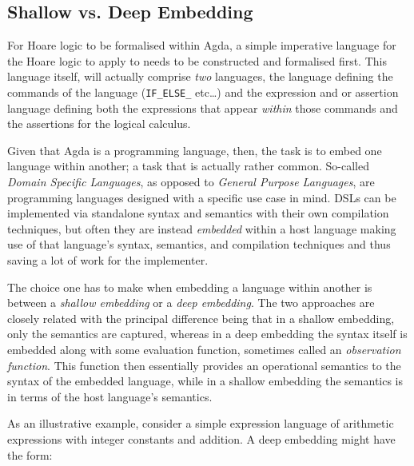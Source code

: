 \documentclass[oneside,12pt]{article}
\newcommand{\impcode}[1]{\textsc{\texttt{#1}}}
\begin{document}
\subsection{Shallow vs. Deep Embedding}
\label{sec:shallowdeep}


For Hoare logic to be formalised within Agda, a simple imperative language for the Hoare logic to apply to needs to be constructed and formalised first. This language itself, will actually comprise \emph{two} languages, the language defining the commands of the language (\impcode{IF\_ELSE\_} etc\ldots) and the expression and or assertion language defining both the expressions that appear \emph{within} those commands and the assertions for the logical calculus.


Given that Agda is a programming language, then, the task is to embed one language within another; a task that is actually rather common. So-called \emph{Domain Specific Languages}, as opposed to \emph{General Purpose Languages}, are programming languages designed with a specific use case in mind. DSLs can be implemented via standalone syntax and semantics with their own compilation techniques, but often they are instead \emph{embedded} within a host language making use of that language's syntax, semantics, and compilation techniques and thus saving a lot of work for the implementer.

The choice one has to make when embedding a language within another is between a \emph{shallow embedding} or a \emph{deep embedding}. The two approaches are closely related with the principal difference being that in a shallow \mbox{embedding}, only the semantics are captured, whereas in a deep embedding the syntax itself is embedded along with some evaluation function, sometimes called an \emph{observation function}. This function then essentially provides an operational semantics to the syntax of the embedded language, while in a shallow embedding the semantics is in terms of the host language's semantics.


As an illustrative example, consider a simple expression language of \mbox{arithmetic} expressions with integer constants and addition. A deep embedding might have the form:
\end{document}
